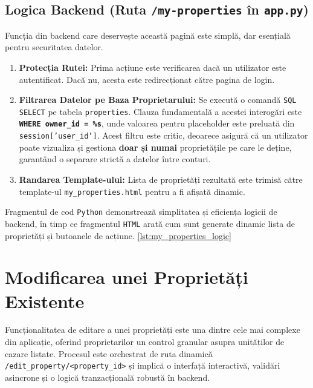 \documentclass[12pt, a4paper, oneside, romanian]{teza-upb}
\begin{document}
\subsection{Logica Backend (Ruta \texttt{/my-properties} în \texttt{app.py})}
Funcția din backend care deservește această pagină este simplă, dar esențială pentru securitatea datelor.
\begin{enumerate}
	\item \textbf{Protecția Rutei:} Prima acțiune este verificarea dacă un utilizator este autentificat. Dacă nu, acesta este redirecționat către pagina de login.
	\item \textbf{Filtrarea Datelor pe Baza Proprietarului:} Se execută o comandă \texttt{SQL SELECT} pe tabela \texttt{properties}. Clauza fundamentală a acestei interogări este \textbf{\texttt{WHERE owner\_id = \%s}}, unde valoarea pentru placeholder este preluată din \texttt{session['user\_id']}. Acest filtru este critic, deoarece asigură că un utilizator poate vizualiza și gestiona \textbf{doar și numai} proprietățile pe care le deține, garantând o separare strictă a datelor între conturi.
	\item \textbf{Randarea Template-ului:} Lista de proprietăți rezultată este trimisă către template-ul \texttt{my\_properties.html} pentru a fi afișată dinamic.
\end{enumerate}

Fragmentul de cod \texttt{Python} demonstrează simplitatea și eficiența logicii de backend, în timp ce fragmentul \texttt{HTML} arată cum sunt generate dinamic lista de proprietăți și butoanele de acțiune. \ref{lst:my_properties_logic}







\section{Modificarea unei Proprietăți Existente}
Funcționalitatea de editare a unei proprietăți este una dintre cele mai complexe din aplicație, oferind proprietarilor un control granular asupra unităților de cazare listate. Procesul este orchestrat de ruta dinamică \texttt{/edit\_property/<property\_id>} și implică o interfață interactivă, validări asincrone și o logică tranzacțională robustă în backend.
\end{document}

